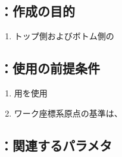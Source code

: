 \clearpage


\subsection{\KOutcutRLeft：作成の目的}
\begin{enumerate}[label*=\sarrow]
\item トップ側およびボトム側の\OutcutMilling
\end{enumerate}


\subsection{\KOutcutRLeft：使用の前提条件}
\begin{enumerate}[label*=\sarrow]
\item \OutcutMilling 用\SquareEndMill を使用
\item {}ワーク座標系原点の基準は、\OutcutCenter
\end{enumerate}


\subsection{\KOutcutRLeft：関連するパラメタ}

